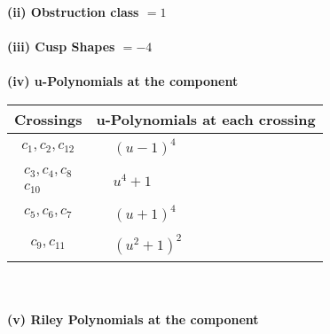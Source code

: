 \documentclass[1p]{elsarticle_modified}
\theoremstyle{definition}
\begin{document}
\flushleft \textbf{(ii) Obstruction class $= 1$}\\~\\
\flushleft \textbf{(iii) Cusp Shapes $= -4$}\\~\\
\newpage\renewcommand{\arraystretch}{1}
\flushleft \textbf{(iv) u-Polynomials at the component}\newline \\
\begin{tabular}{m{50pt}|m{274pt}}
Crossings & \hspace{64pt}u-Polynomials at each crossing \\
\hline $$\begin{aligned}c_{1},c_{2},c_{12}\end{aligned}$$&$\begin{aligned}
&(u-1)^4
\end{aligned}$\\
\hline $$\begin{aligned}c_{3},c_{4},c_{8}\\c_{10}\end{aligned}$$&$\begin{aligned}
&u^4+1
\end{aligned}$\\
\hline $$\begin{aligned}c_{5},c_{6},c_{7}\end{aligned}$$&$\begin{aligned}
&(u+1)^4
\end{aligned}$\\
\hline $$\begin{aligned}c_{9},c_{11}\end{aligned}$$&$\begin{aligned}
&(u^2+1)^2
\end{aligned}$\\
\hline
\end{tabular}\\~\\
\newpage\renewcommand{\arraystretch}{1}
\flushleft \textbf{(v) Riley Polynomials at the component}\newline \\
\end{document}
